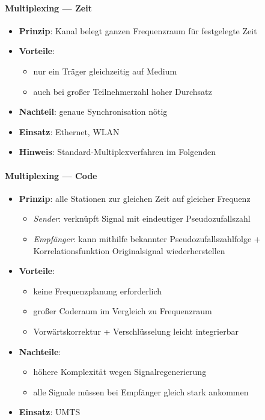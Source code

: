 \paragraph{Multiplexing --- Zeit}
\begin{itemize}
  \item \textbf{Prinzip}: Kanal belegt ganzen Frequenzraum für festgelegte Zeit
  \item \textbf{Vorteile}:
  \begin{itemize}
    \item nur ein Träger gleichzeitig auf Medium
    \item auch bei großer Teilnehmerzahl hoher Durchsatz
  \end{itemize}
  \item \textbf{Nachteil}: genaue Synchronisation nötig
  \item \textbf{Einsatz}: Ethernet, WLAN
  \item \textbf{Hinweis}: Standard-Multiplexverfahren im Folgenden
\end{itemize}

\paragraph{Multiplexing --- Code}
\begin{itemize}
  \item \textbf{Prinzip}: alle Stationen zur gleichen Zeit auf gleicher Frequenz
  \begin{itemize}
    \item \emph{Sender}: verknüpft Signal mit eindeutiger Pseudozufallszahl
    \item \emph{Empfänger}: kann mithilfe bekannter Pseudozufallszahlfolge + Korrelationsfunktion Originalsignal wiederherstellen
  \end{itemize}
  \item \textbf{Vorteile}:
  \begin{itemize}
    \item keine Frequenzplanung erforderlich
    \item großer Coderaum im Vergleich zu Frequenzraum
    \item Vorwärtskorrektur + Verschlüsselung leicht integrierbar
  \end{itemize}
  \item \textbf{Nachteile}:
  \begin{itemize}
    \item höhere Komplexität wegen Signalregenerierung
    \item alle Signale müssen bei Empfänger gleich stark ankommen
  \end{itemize}
  \item \textbf{Einsatz}: UMTS
\end{itemize}

